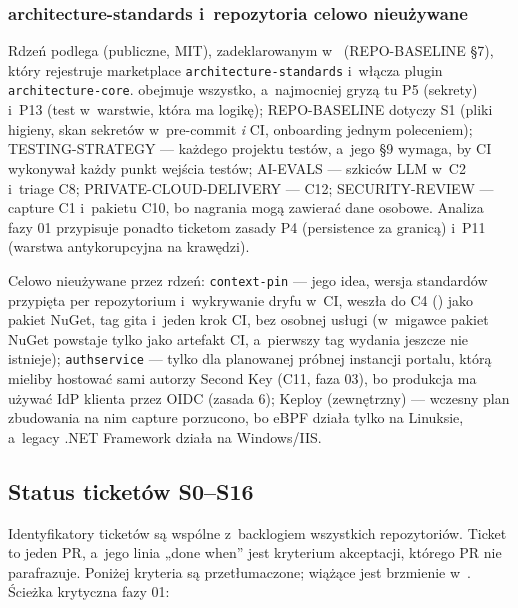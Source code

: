 \subsubsection{architecture-standards i~repozytoria celowo nieużywane}

Rdzeń podlega  (publiczne, MIT), zadeklarowanym w~ (REPO-BASELINE §7), który rejestruje marketplace
\texttt{architecture-standards} i~włącza plugin \texttt{architecture-core}.
 obejmuje wszystko, a~najmocniej gryzą tu P5 (sekrety) i~P13 (test w~warstwie, która ma logikę); REPO-BASELINE dotyczy S1 (pliki higieny, skan
sekretów w~pre-commit \emph{i} CI, onboarding jednym poleceniem); TESTING-STRATEGY ---
każdego projektu testów, a~jego §9 wymaga, by CI wykonywał każdy punkt wejścia testów;
AI-EVALS --- szkiców LLM w~C2 i~triage C8; PRIVATE-CLOUD-DELIVERY --- C12;
SECURITY-REVIEW --- capture C1 i~pakietu C10, bo nagrania mogą zawierać dane osobowe.
Analiza fazy 01 przypisuje ponadto ticketom zasady P4 (persistence za granicą) i~P11
(warstwa antykorupcyjna na krawędzi).

Celowo nieużywane przez rdzeń: \texttt{context-pin} --- jego idea, wersja standardów
przypięta per repozytorium i~wykrywanie dryfu w~CI, weszła do C4
() jako pakiet NuGet, tag gita i~jeden krok CI, bez
osobnej usługi (w~migawce pakiet NuGet powstaje tylko jako artefakt CI, a~pierwszy tag wydania
jeszcze nie istnieje); \texttt{authservice} --- tylko dla planowanej próbnej instancji portalu, którą mieliby hostować
sami autorzy Second Key (C11, faza 03), bo produkcja ma używać IdP klienta przez OIDC (zasada 6); Keploy
(zewnętrzny) --- wczesny plan zbudowania na nim capture porzucono, bo eBPF działa tylko na
Linuksie, a~legacy .NET Framework działa na Windows/IIS.


\subsection{Status ticketów S0–S16}\label{sec:rdzen-status}

Identyfikatory ticketów są wspólne z~backlogiem wszystkich repozytoriów. Ticket to jeden PR,
a~jego linia „done when” jest kryterium akceptacji, którego PR nie parafrazuje. Poniżej
kryteria są przetłumaczone; wiążące jest brzmienie w~. Ścieżka
krytyczna fazy 01:

